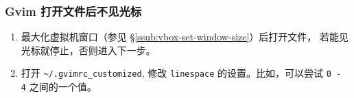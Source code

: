 \documentclass[
    11pt,
    base=hide,
    cite=authoryear,
    device=phone,
    lang=cn,
    mode=simple,
    result=answer,
    toc=onecol,
]{elegantbook_sierxue}
\begin{document}
\subsubsection{Gvim 打开文件后不见光标}%
\label{ssub:vim-ts-cursor}

\begin{enumerate}
    \item 最大化虚拟机窗口（参见
        \S\ref{ssub:vbox-set-window-size}）后打开文件，
        若能见光标就停止，否则进入下一步。
    \item 打开 \lstinline{~/.gvimrc_customized}, 修改
        \lstinline{linespace} 的设置。比如，可以尝试  \lstinline{0 - 4}
        之间的一个值。
\end{enumerate}

\printindex
\printglossary[title={术语表}]
\end{document}
